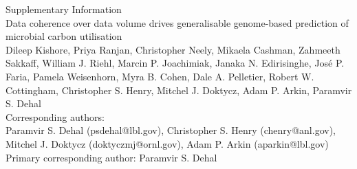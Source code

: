 






\thispagestyle{empty}

\begin{center}
  {\huge Supplementary Information}\\[0.8cm]
  {\large Data coherence over data volume drives generalisable genome-based
  prediction of microbial carbon utilisation}\\[0.8cm]
  Dileep Kishore, Priya Ranjan, Christopher Neely, Mikaela Cashman,
  Zahmeeth Sakkaff, William J. Riehl, Marcin P. Joachimiak,
  Janaka N. Edirisinghe, Jos\'{e} P. Faria, Pamela Weisenhorn, Myra B. Cohen,
  Dale A. Pelletier, Robert W. Cottingham, Christopher S. Henry,
  Mitchel J. Doktycz, Adam P. Arkin, Paramvir S. Dehal\\[0.5cm]
  Corresponding authors:\\
  Paramvir S. Dehal (psdehal@lbl.gov),
  Christopher S. Henry (chenry@anl.gov),\\
  Mitchel J. Doktycz (doktyczmj@ornl.gov),
  Adam P. Arkin (aparkin@lbl.gov)\\
  Primary corresponding author: Paramvir S. Dehal
\end{center}

\vspace{1cm}

\linenumbers
\setlength\linenumbersep{15pt}
\renewcommand\linenumberfont{\normalfont\footnotesize\sffamily\color{gray}}
\modulolinenumbers[1]

\doublespacing



\newpage
\singlespacing
\printbibliography[title={Supplementary References}]


